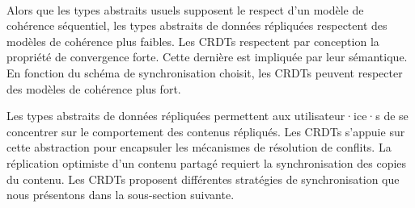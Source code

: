 
\paragraph{} Alors que les types abstraits usuels supposent le respect d'un modèle de cohérence séquentiel, les types abstraits de données répliquées respectent des modèles de cohérence plus faibles.
Les \acp{CRDT} respectent par conception la propriété de convergence forte.
Cette dernière est impliquée par leur sémantique.
En fonction du schéma de synchronisation choisit, les \acp{CRDT} peuvent respecter des modèles de cohérence plus fort.



Les types abstraits de données répliquées permettent aux utilisateur·ice·s de se concentrer sur le comportement des contenus répliqués.
Les \acp{CRDT} s'appuie sur cette abstraction pour encapsuler les mécanismes de résolution de conflits.
La réplication optimiste d'un contenu partagé requiert la synchronisation des copies du contenu.
Les \acp{CRDT} proposent différentes stratégies de synchronisation que nous présentons dans la sous-section suivante.


